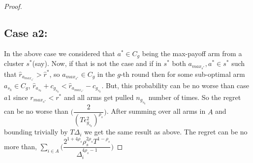 \begin{proof}
\subsection{Case a2:}
In the above case we considered that $a^{*}\in C_{g}$ being the max-payoff arm from a cluster $s^{*}$(say). Now, if that is not the case and if in $s^{*}$ both $a_{max_{s^{*}}}, a^{*}\in s^{*}$ such that $\hat{r}_{a_{max_{s^{*}}}}> \hat{r}^{*}$, so $a_{max_{s^{*}}}\in C_{g}$ in the $g$-th round then for some sub-optimal arm $a_{s_{k}}\in C_{g}$, $\hat{r}_{a_{s_{k}}}+c_{g_{s_{k}}}< \hat{r}_{a_{max_{s^{*}}}}-c_{g_{s_{k}}}$. But, this probability can be no worse than case $a1$ since $r_{max_{s^{*}}} < r^{*}$ and all arms get pulled $n_{g_{s_{k}}}$ number of times. So the regret can be no worse than $\bigg(\dfrac{2}{(T\epsilon_{g_{s_{k}}}^{2})^{\rho_{s}}}\bigg)$. After summing over all arms in $A$ and bounding trivially by $T\Delta_{i}$ we get the same result as above. The regret can be no more than,
\newline
$\sum_{i\in A}\bigg(\dfrac{2^{1+4\rho_{s}}\rho_{s}^{2\rho_{s}}T^{1-\rho_{s}}}{\Delta_{i}^{4\rho_{s}-1}}\bigg)$


\end{proof}
